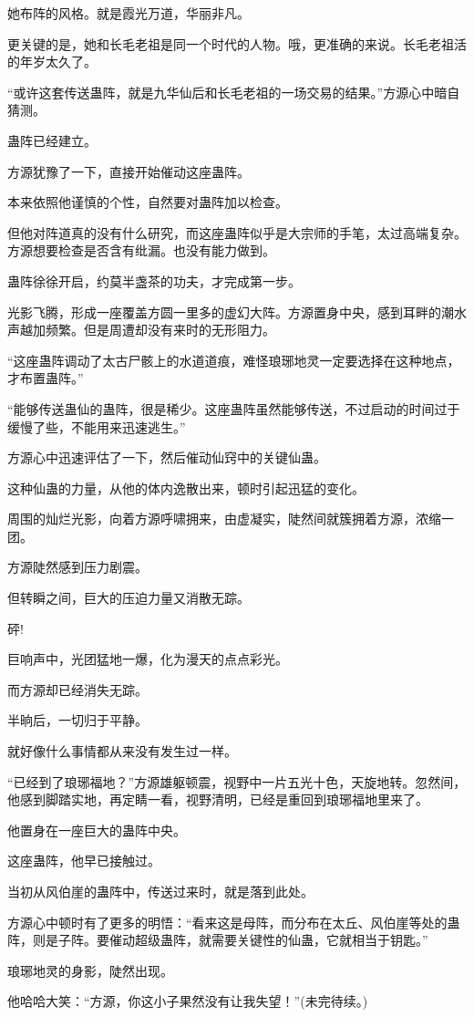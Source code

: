 \begin{this_body}
她布阵的风格。就是霞光万道，华丽非凡。

更关键的是，她和长毛老祖是同一个时代的人物。哦，更准确的来说。长毛老祖活的年岁太久了。

“或许这套传送蛊阵，就是九华仙后和长毛老祖的一场交易的结果。”方源心中暗自猜测。

蛊阵已经建立。

方源犹豫了一下，直接开始催动这座蛊阵。

本来依照他谨慎的个性，自然要对蛊阵加以检查。

但他对阵道真的没有什么研究，而这座蛊阵似乎是大宗师的手笔，太过高端复杂。方源想要检查是否含有纰漏。也没有能力做到。

蛊阵徐徐开启，约莫半盏茶的功夫，才完成第一步。

光影飞腾，形成一座覆盖方圆一里多的虚幻大阵。方源置身中央，感到耳畔的潮水声越加频繁。但是周遭却没有来时的无形阻力。

“这座蛊阵调动了太古尸骸上的水道道痕，难怪琅琊地灵一定要选择在这种地点，才布置蛊阵。”

“能够传送蛊仙的蛊阵，很是稀少。这座蛊阵虽然能够传送，不过启动的时间过于缓慢了些，不能用来迅速逃生。”

方源心中迅速评估了一下，然后催动仙窍中的关键仙蛊。

这种仙蛊的力量，从他的体内逸散出来，顿时引起迅猛的变化。

周围的灿烂光影，向着方源呼啸拥来，由虚凝实，陡然间就簇拥着方源，浓缩一团。

方源陡然感到压力剧震。

但转瞬之间，巨大的压迫力量又消散无踪。

砰!

巨响声中，光团猛地一爆，化为漫天的点点彩光。

而方源却已经消失无踪。

半晌后，一切归于平静。

就好像什么事情都从来没有发生过一样。

“已经到了琅琊福地？”方源雄躯顿震，视野中一片五光十色，天旋地转。忽然间，他感到脚踏实地，再定睛一看，视野清明，已经是重回到琅琊福地里来了。

他置身在一座巨大的蛊阵中央。

这座蛊阵，他早已接触过。

当初从风伯崖的蛊阵中，传送过来时，就是落到此处。

方源心中顿时有了更多的明悟：“看来这是母阵，而分布在太丘、风伯崖等处的蛊阵，则是子阵。要催动超级蛊阵，就需要关键性的仙蛊，它就相当于钥匙。”

琅琊地灵的身影，陡然出现。

他哈哈大笑：“方源，你这小子果然没有让我失望！”(未完待续。)

\end{this_body}

